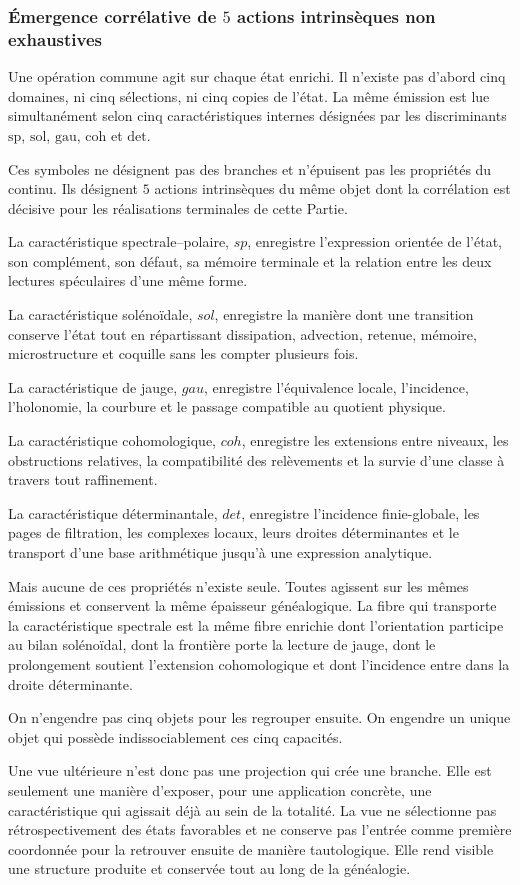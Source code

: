 \subsubsection{Émergence corrélative de \texorpdfstring{\(5\)}{5} actions intrinsèques non exhaustives}
Une opération commune agit sur chaque état enrichi. Il n’existe pas d’abord cinq domaines, ni cinq sélections, ni cinq copies de l’état. La même émission est lue simultanément selon cinq caractéristiques internes désignées par les discriminants \(\mathrm{sp}\), \(\mathrm{sol}\), \(\mathrm{gau}\), \(\mathrm{coh}\) et \(\mathrm{det}\).\par
Ces symboles ne désignent pas des branches et n’épuisent pas les propriétés du continu. Ils désignent \(5\) actions intrinsèques du même objet dont la corrélation est décisive pour les réalisations terminales de cette Partie.\par
La caractéristique spectrale–polaire, \(sp\), enregistre l’expression orientée de l’état, son complément, son défaut, sa mémoire terminale et la relation entre les deux lectures spéculaires d’une même forme.\par
La caractéristique solénoïdale, \(sol\), enregistre la manière dont une transition conserve l’état tout en répartissant dissipation, advection, retenue, mémoire, microstructure et coquille sans les compter plusieurs fois.\par
La caractéristique de jauge, \(gau\), enregistre l’équivalence locale, l’incidence, l’holonomie, la courbure et le passage compatible au quotient physique.\par
La caractéristique cohomologique, \(coh\), enregistre les extensions entre niveaux, les obstructions relatives, la compatibilité des relèvements et la survie d’une classe à travers tout raffinement.\par
La caractéristique déterminantale, \(det\), enregistre l’incidence finie-globale, les pages de filtration, les complexes locaux, leurs droites déterminantes et le transport d’une base arithmétique jusqu’à une expression analytique.\par
Mais aucune de ces propriétés n’existe seule. Toutes agissent sur les mêmes émissions et conservent la même épaisseur généalogique. La fibre qui transporte la caractéristique spectrale est la même fibre enrichie dont l’orientation participe au bilan solénoïdal, dont la frontière porte la lecture de jauge, dont le prolongement soutient l’extension cohomologique et dont l’incidence entre dans la droite déterminante.\par
On n’engendre pas cinq objets pour les regrouper ensuite. On engendre un unique objet qui possède indissociablement ces cinq capacités.\par
Une vue ultérieure n’est donc pas une projection qui crée une branche. Elle est seulement une manière d’exposer, pour une application concrète, une caractéristique qui agissait déjà au sein de la totalité. La vue ne sélectionne pas rétrospectivement des états favorables et ne conserve pas l’entrée comme première coordonnée pour la retrouver ensuite de manière tautologique. Elle rend visible une structure produite et conservée tout au long de la généalogie.\par
{}
